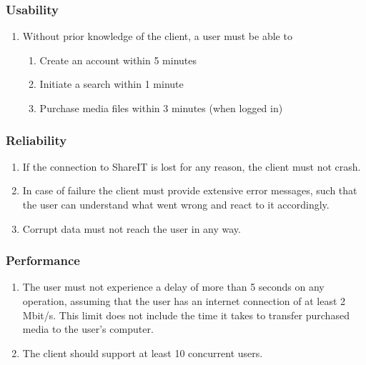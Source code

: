 \documentclass[../report.tex]{subfiles}
\begin{document}

\subsubsection{Usability}

\begin{enumerate}[label=\textbf{NFR-\twodigits*}]
\item Without prior knowledge of the client, a user must be able to
	\begin{enumerate}
	\item Create an account within 5 minutes
	\item Initiate a search within 1 minute
	\item Purchase media files within 3 minutes (when logged in)
	\end{enumerate}
\end{enumerate}

\subsubsection{Reliability}

\begin{enumerate}[label=\textbf{NFR-\twodigits*}, resume]
\item If the connection to ShareIT is lost for any reason, the client must not crash. 
\item In case of failure the client must provide extensive error messages, such that the user can understand what went wrong and react to it accordingly.
\item Corrupt data must not reach the user in any way.
\end{enumerate}

\subsubsection{Performance}

\begin{enumerate}[label=\textbf{NFR-\twodigits*}, resume]
\item The user must not experience a delay of more than 5 seconds on any operation, assuming that the user has an internet connection of at least 2 Mbit/s. This limit does not include the time it takes to transfer purchased media to the user's computer.
\item The client should support at least 10 concurrent users. 
\end{enumerate}
\end{document}
